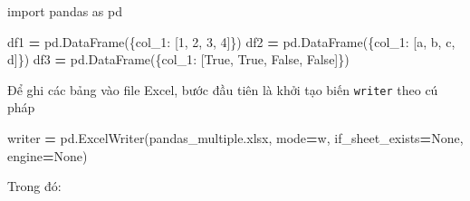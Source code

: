 \documentclass[
]{book}
\newenvironment{Shaded}{\begin{snugshade}}{\end{snugshade}}
\newcommand{\DecValTok}[1]{\textcolor[rgb]{0.00,0.00,0.81}{#1}}
\newcommand{\ImportTok}[1]{#1}
\newcommand{\NormalTok}[1]{#1}
\newcommand{\OperatorTok}[1]{\textcolor[rgb]{0.81,0.36,0.00}{\textbf{#1}}}
\newcommand{\StringTok}[1]{\textcolor[rgb]{0.31,0.60,0.02}{#1}}
\newcommand{\VariableTok}[1]{\textcolor[rgb]{0.00,0.00,0.00}{#1}}
\begin{document}
\begin{Shaded}
\begin{Highlighting}[]
\ImportTok{import}\NormalTok{ pandas }\ImportTok{as}\NormalTok{ pd}

\NormalTok{df1 }\OperatorTok{=}\NormalTok{ pd.DataFrame(\{}\StringTok{\textquotesingle{}col\_1\textquotesingle{}}\NormalTok{: [}\DecValTok{1}\NormalTok{, }\DecValTok{2}\NormalTok{, }\DecValTok{3}\NormalTok{, }\DecValTok{4}\NormalTok{]\})}
\NormalTok{df2 }\OperatorTok{=}\NormalTok{ pd.DataFrame(\{}\StringTok{\textquotesingle{}col\_1\textquotesingle{}}\NormalTok{: [}\StringTok{\textquotesingle{}a\textquotesingle{}}\NormalTok{, }\StringTok{\textquotesingle{}b\textquotesingle{}}\NormalTok{, }\StringTok{\textquotesingle{}c\textquotesingle{}}\NormalTok{, }\StringTok{\textquotesingle{}d\textquotesingle{}}\NormalTok{]\})}
\NormalTok{df3 }\OperatorTok{=}\NormalTok{ pd.DataFrame(\{}\StringTok{\textquotesingle{}col\_1\textquotesingle{}}\NormalTok{: [}\VariableTok{True}\NormalTok{, }\VariableTok{True}\NormalTok{, }\VariableTok{False}\NormalTok{, }\VariableTok{False}\NormalTok{]\})}
\end{Highlighting}
\end{Shaded}

Để ghi các bảng vào file Excel, bước đầu tiên là khởi tạo biến \texttt{writer} theo cú pháp

\begin{Shaded}
\begin{Highlighting}[]
\NormalTok{writer }\OperatorTok{=}\NormalTok{ pd.ExcelWriter(}\StringTok{\textquotesingle{}pandas\_multiple.xlsx\textquotesingle{}}\NormalTok{, mode}\OperatorTok{=}\StringTok{\textquotesingle{}w\textquotesingle{}}\NormalTok{,  if\_sheet\_exists}\OperatorTok{=}\VariableTok{None}\NormalTok{, engine}\OperatorTok{=}\VariableTok{None}\NormalTok{)}
\end{Highlighting}
\end{Shaded}

Trong đó:
\end{document}
